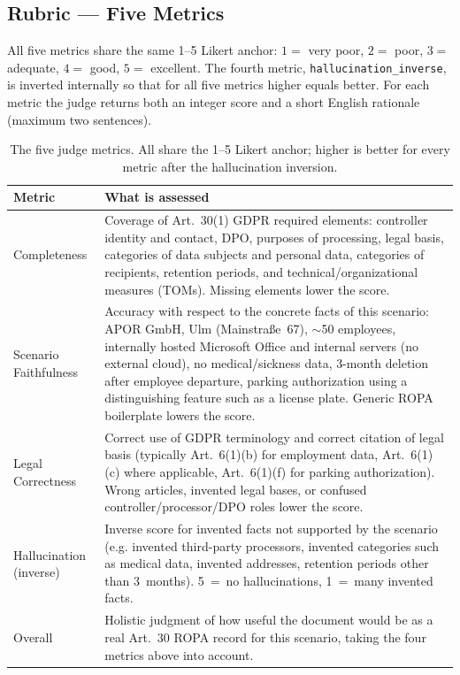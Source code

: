 \subsection{Rubric --- Five Metrics}
\label{app:judge-rubric}

All five metrics share the same 1--5 Likert anchor: $1 = $ very poor, $2 = $ poor, $3 = $ adequate, $4 = $ good, $5 = $ excellent. The fourth metric, \texttt{hallucination\_inverse}, is inverted internally so that for all five metrics higher equals better. For each metric the judge returns both an integer score and a short English rationale (maximum two sentences).

\begin{table}[htbp]
\centering
\small
\begin{tabularx}{\textwidth}{lX}
\toprule
\textbf{Metric} & \textbf{What is assessed} \\
\midrule
Completeness & Coverage of Art.~30(1) GDPR required elements: controller identity and contact, DPO, purposes of processing, legal basis, categories of data subjects and personal data, categories of recipients, retention periods, and technical/organizational measures (TOMs). Missing elements lower the score. \\
\addlinespace
Scenario Faithfulness & Accuracy with respect to the concrete facts of this scenario: APOR GmbH, Ulm (Mainstraße~67), $\sim$50 employees, internally hosted Microsoft Office and internal servers (no external cloud), no medical/sickness data, 3-month deletion after employee departure, parking authorization using a distinguishing feature such as a license plate. Generic ROPA boilerplate lowers the score. \\
\addlinespace
Legal Correctness & Correct use of GDPR terminology and correct citation of legal basis (typically Art.~6(1)(b) for employment data, Art.~6(1)(c) where applicable, Art.~6(1)(f) for parking authorization). Wrong articles, invented legal bases, or confused controller/processor/DPO roles lower the score. \\
\addlinespace
Hallucination (inverse) & Inverse score for invented facts not supported by the scenario (e.g. invented third-party processors, invented categories such as medical data, invented addresses, retention periods other than 3~months). 5~=~no hallucinations, 1~=~many invented facts. \\
\addlinespace
Overall & Holistic judgment of how useful the document would be as a real Art.~30 ROPA record for this scenario, taking the four metrics above into account. \\
\bottomrule
\end{tabularx}
\caption{The five judge metrics. All share the 1--5 Likert anchor; higher is better for every metric after the hallucination inversion.}
\label{tab:judge-rubric}
\end{table}


